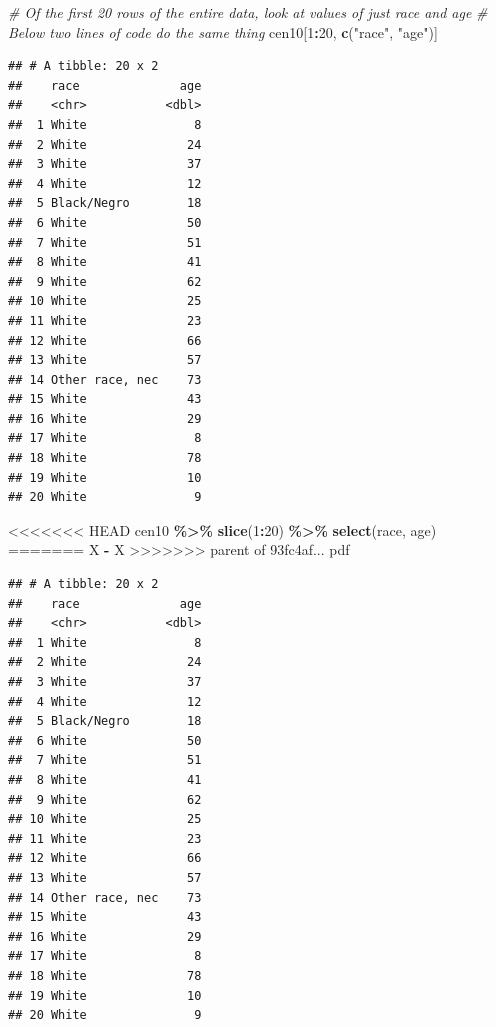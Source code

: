 \documentclass[]{book}
\newenvironment{Shaded}{\begin{snugshade}}{\end{snugshade}}
\newcommand{\CommentTok}[1]{\textcolor[rgb]{0.56,0.35,0.01}{\textit{#1}}}
\newcommand{\DecValTok}[1]{\textcolor[rgb]{0.00,0.00,0.81}{#1}}
\newcommand{\KeywordTok}[1]{\textcolor[rgb]{0.13,0.29,0.53}{\textbf{#1}}}
\newcommand{\NormalTok}[1]{#1}
\newcommand{\OperatorTok}[1]{\textcolor[rgb]{0.81,0.36,0.00}{\textbf{#1}}}
\newcommand{\StringTok}[1]{\textcolor[rgb]{0.31,0.60,0.02}{#1}}
\theoremstyle{definition}
\theoremstyle{definition}
\theoremstyle{definition}
\theoremstyle{remark}
\begin{document}
\begin{Shaded}
\begin{Highlighting}[]
\begin{Shaded}
\begin{Highlighting}[]
\begin{Shaded}
\begin{Highlighting}[]
\CommentTok{\# Of the first 20 rows of the entire data, look at values of just race and age}
\CommentTok{\# Below two lines of code do the same thing}
\NormalTok{cen10[}\DecValTok{1}\OperatorTok{:}\DecValTok{20}\NormalTok{, }\KeywordTok{c}\NormalTok{(}\StringTok{"race"}\NormalTok{, }\StringTok{"age"}\NormalTok{)]}
\end{Highlighting}
\end{Shaded}

\begin{verbatim}
## # A tibble: 20 x 2
##    race              age
##    <chr>           <dbl>
##  1 White               8
##  2 White              24
##  3 White              37
##  4 White              12
##  5 Black/Negro        18
##  6 White              50
##  7 White              51
##  8 White              41
##  9 White              62
## 10 White              25
## 11 White              23
## 12 White              66
## 13 White              57
## 14 Other race, nec    73
## 15 White              43
## 16 White              29
## 17 White               8
## 18 White              78
## 19 White              10
## 20 White               9
\end{verbatim}

\begin{Shaded}
\begin{Highlighting}[]
<<<<<<< HEAD
\NormalTok{cen10 }\OperatorTok{\%>\%}\StringTok{ }\KeywordTok{slice}\NormalTok{(}\DecValTok{1}\OperatorTok{:}\DecValTok{20}\NormalTok{) }\OperatorTok{\%>\%}\StringTok{ }\KeywordTok{select}\NormalTok{(race, age)}
=======
\NormalTok{X }\OperatorTok{-}\StringTok{ }\NormalTok{X}
>>>>>>> parent of 93fc4af... pdf
\end{Highlighting}
\end{Shaded}

\begin{verbatim}
## # A tibble: 20 x 2
##    race              age
##    <chr>           <dbl>
##  1 White               8
##  2 White              24
##  3 White              37
##  4 White              12
##  5 Black/Negro        18
##  6 White              50
##  7 White              51
##  8 White              41
##  9 White              62
## 10 White              25
## 11 White              23
## 12 White              66
## 13 White              57
## 14 Other race, nec    73
## 15 White              43
## 16 White              29
## 17 White               8
## 18 White              78
## 19 White              10
## 20 White               9
\end{verbatim}


\end{Highlighting}
\end{Shaded}
\end{Highlighting}
\end{Shaded}
\end{document}
